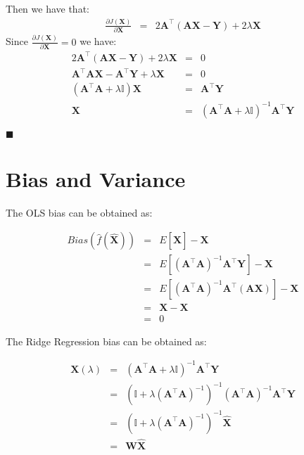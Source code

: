 Then we have that:
\begin{eqnarray*}
\frac{\partial J(\mathbf{\mathbf{X}})}{\partial \mathbf{X}}&=& 
 2\mathbf{A}^\top(\mathbf{A}\mathbf{X}-\mathbf{Y}) + 2\lambda\mathbf{X}
\end{eqnarray*}
Since $\frac{\partial J(\mathbf{\mathbf{X}})}{\partial \mathbf{X}}=0$ we have:
\begin{eqnarray*}
2\mathbf{A}^\top(\mathbf{A}\mathbf{X}-\mathbf{Y}) + 2\lambda\mathbf{X}&=&0 \\
\mathbf{A}^\top\mathbf{A}\mathbf{X} - \mathbf{A}^\top\mathbf{Y} + \lambda\mathbf{X} &=& 0\\
(\mathbf{A}^\top\mathbf{A}+\lambda\mathbb{I})\mathbf{X} &=&  \mathbf{A}^\top\mathbf{Y} \\
\mathbf{X} &=& (\mathbf{A}^\top\mathbf{A}+\lambda\mathbb{I})^{-1}  \mathbf{A}^\top\mathbf{Y}
\end{eqnarray*}

$\blacksquare$

\section{Bias and Variance}\label{app:biasandvariance}

The OLS bias can be obtained as:

\begin{eqnarray*}
Bias(\hat{f}(\hat{\mathbf{X}})) &=& E[\hat{\mathbf{X}}] - \mathbf{X} \\
&=& E[ (\mathbf{A}^\top \mathbf{A})^{-1}\mathbf{A}^\top \mathbf{Y}] - \mathbf{X} \\
&=& E[ (\mathbf{A}^\top \mathbf{A})^{-1}\mathbf{A}^\top (\mathbf{AX})] - \mathbf{X}  \\
&=& \mathbf{X}  - \mathbf{X}  \\
&=&  0
\end{eqnarray*}

The Ridge Regression bias can be obtained as:

\begin{eqnarray*}
\mathbf{X}(\lambda) &=&( \mathbf{A}^\top \mathbf{A} + \lambda \mathbb{I})^{-1}\mathbf{A}^\top \mathbf{Y} \\
&=& (\mathbb{I} + \lambda (\mathbf{A}^\top \mathbf{A})^{-1})^{-1} (\mathbf{A}^\top \mathbf{A})^{-1}\mathbf{A}^\top \mathbf{Y} \\
&=&  (\mathbb{I} + \lambda (\mathbf{A}^\top \mathbf{A})^{-1})^{-1}  \hat{\mathbf{X}} \\
&=& \mathbf{W} \hat{\mathbf{X}} 
\end{eqnarray*}

